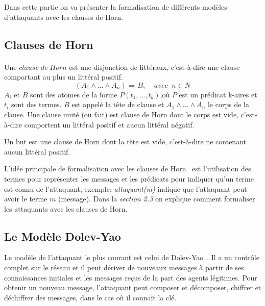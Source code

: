 \documentclass[10pt,a4paper]{article}
\begin{document}
Dans cette partie on va présenter la formalisation de différents modèles d'attaquants avec les clauses de Horn.   
\subsection{Clauses de Horn}
\paragraph{}
Une $clause\; de\; Horn$ est une disjonction de littéraux, c'est-à-dire une clause comportant au plus un littéral positif.  
\[(A_{1}\wedge...\wedge A_{n})\Rightarrow B ,\;\;\;\; avec\;\; n \in N  \]
$A_{i}$ et $B$ sont des atomes de la forme $P(t_{1},...,t_{k})$,où $P$ est un prédicat k-aires et $t_{i}$ sont des termes. $B$ est appelé la t\^{e}te de clause et $A_{1}\wedge...\wedge A_{n}$ le corps de la clause. Une clause unité (ou fait) est clause de Horn dont le corps est vide, c'est-à-dire comportent un littéral positif et aucun littéral négatif.\newline

Un but est une clause de Horn dont la t\^{e}te est vide, c'est-à-dire ne contenant aucun littéral positif. 		    \newline

L'idée principale de formalisation avec les clauses de Horn~\cite{ref2} est l’utilisation des
termes pour représenter les messages et les prédicats pour indiquer qu'un terme est connu de l'attaquant, exemple: \textit{attaquant(m)} indique que l'attaquant peut avoir le terme $m$   (message). Dans la \textit{section 2.3} on explique comment formaliser les attaquants avec les clauses de Horn.

\subsection{Le Modèle Dolev-Yao}
Le modèle de l'attaquant le plus courant est celui de Dolev-Yao~\cite{ref3}. Il a un contr\^{o}le complet sur le réseau et il peut dériver de nouveaux messages à partir de ses connaissances initiales et les messages reçus de la part des agents légitimes. Pour obtenir un nouveau message, l'attaquant peut composer et décomposer, chiffrer et déchiffrer des messages, dans le cas o\`{u} il connaît la clé.\newline
\end{document}
